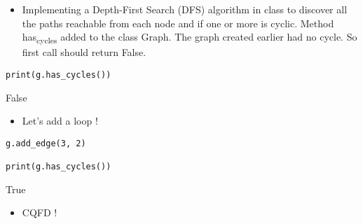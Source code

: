 \documentclass[11pt]{article}
\begin{document}
\begin{itemize}
\item Implementing a Depth-First Search (DFS) algorithm in class to discover all the paths reachable from
each node and if one or more is cyclic. Method has\textsubscript{cycles} added to the class
Graph.
The graph created earlier had no cycle. So first call should return False.
\end{itemize}

\begin{verbatim}
print(g.has_cycles())
\end{verbatim}

False

\begin{itemize}
\item Let's add a loop !
\end{itemize}

\begin{verbatim}
g.add_edge(3, 2)

print(g.has_cycles())
\end{verbatim}

True

\begin{itemize}
\item CQFD !
\end{itemize}
\end{document}
